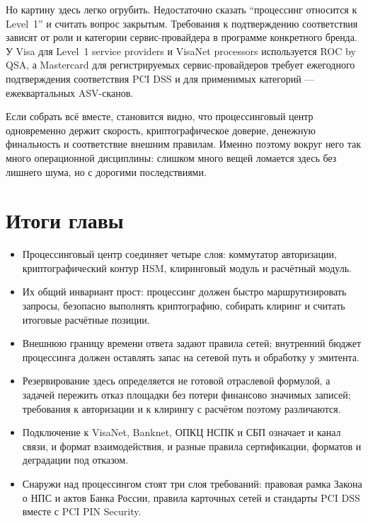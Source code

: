 Но картину здесь легко огрубить. Недостаточно сказать
\enquote{процессинг относится к Level~1} и считать вопрос
закрытым. Требования к подтверждению соответствия зависят
от роли и категории сервис-провайдера в программе конкретного
бренда. У Visa для Level~1 service providers и VisaNet
processors используется ROC by QSA, а Mastercard для
регистрируемых сервис-провайдеров требует ежегодного
подтверждения соответствия PCI DSS и для применимых
категорий — ежеквартальных ASV-сканов.~\cite{visa-pci-validation-best-practice,mc-service-provider-categories-pci,pci-faq-1234-asv}

Если собрать всё вместе, становится видно, что процессинговый
центр одновременно держит скорость,
криптографическое доверие, денежную финальность и соответствие
внешним правилам. Именно поэтому вокруг него так много
операционной дисциплины: слишком много вещей ломается здесь
без лишнего шума, но с дорогими последствиями.

\section*{Итоги главы}
\begin{itemize}
  \item Процессинговый центр соединяет четыре слоя:
        коммутатор авторизации, криптографический контур HSM,
        клиринговый модуль и расчётный модуль.
  \item Их общий инвариант прост: процессинг должен быстро
        маршрутизировать запросы, безопасно выполнять
        криптографию, собирать клиринг и считать итоговые
        расчётные позиции.
  \item Внешнюю границу времени ответа задают правила сетей;
        внутренний бюджет процессинга должен оставлять запас
        на сетевой путь и обработку у эмитента.
  \item Резервирование здесь определяется не готовой
        отраслевой формулой, а задачей пережить отказ площадки
        без потери финансово значимых записей; требования
        к авторизации и к клирингу с расчётом поэтому
        различаются.
  \item Подключение к VisaNet, Banknet, ОПКЦ НСПК и СБП
        означает и канал связи, и формат взаимодействия,
        и разные правила сертификации, форматов
        и деградации под отказом.
  \item Снаружи над процессингом стоят три слоя требований:
        правовая рамка Закона о НПС и актов Банка России,
        правила карточных сетей и стандарты PCI DSS
        вместе с PCI PIN Security.
\end{itemize}
